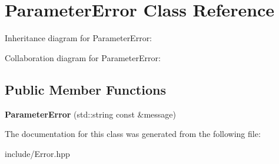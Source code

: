 \hypertarget{class_parameter_error}{}\section{Parameter\+Error Class Reference}
\label{class_parameter_error}


Inheritance diagram for Parameter\+Error\+:


Collaboration diagram for Parameter\+Error\+:
\subsection*{Public Member Functions}
\begin{DoxyCompactItemize}
\item 
\mbox{\label{class_parameter_error_a5a5e5a3e1545b9208663cc5c4e1b0023}} 
{\bfseries Parameter\+Error} (std\+::string const \&message)
\end{DoxyCompactItemize}


The documentation for this class was generated from the following file\+:\begin{DoxyCompactItemize}
\item 
include/Error.\+hpp\end{DoxyCompactItemize}
